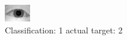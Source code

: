 \begin{figure}[h!]
\begin{center}
\includegraphics[width=0.60\columnwidth]{figures/ID955_class_1_target_2.png}
\end{center}
\caption{ Classification: 1 actual target: 2}
\label{fig:ID955_class_1_target_2}
\end{figure}
